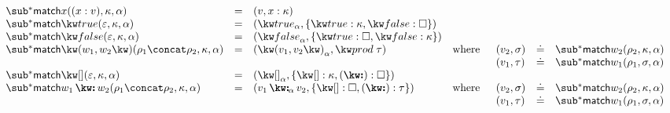 $\begin{array}{lllll}
   \matchBwdF{\matchVarNew{x}}(\bind{x}{v}, \kappa, \alpha)
   &=&
   (v, \elimVar{x}{\kappa})
   \\
   \matchBwdF{\matchTrueNew}(\seqEmpty, \kappa, \alpha)
   &=&
   (\annTrue{\alpha}, \elimBool{\kappa}{\hole})
   \\
   \matchBwdF{\matchFalseNew}(\seqEmpty, \kappa, \alpha)
   &=&
   (\annFalse{\alpha}, \elimBool{\hole}{\kappa})
   \\
   \matchBwdF{\matchPair{w_1}{w_2}}(\rho_1 \concat \rho_2, \kappa, \alpha)
   &=&
   (\annPair{v_1}{v_2}{\alpha}, \elimProd{\tau})
   &\text{where}&
   \begin{array}[t]{lll}
      (v_2, \sigma) &\eq& \matchBwdF{w_2}(\rho_2, \kappa, \alpha)
      \\
      (v_1, \tau) &\eq& \matchBwdF{w_1}(\rho_1, \sigma, \alpha)
   \end{array}
   \\
   \matchBwdF{\matchNilNew}(\seqEmpty,\kappa,\alpha)
   &=&
   (\annNil{\alpha}, \elimList{\kappa}{\hole})
   \\
   \matchBwdF{\matchConsNew{w_1}{w_2}}(\rho_1 \concat \rho_2, \kappa, \alpha)
   &=&
   (\annCons{v_1}{v_2}{\alpha}, \elimList{\hole}{\tau})
   &\text{where}&
   \begin{array}[t]{lll}
      (v_2, \sigma) &\eq& \matchBwdF{w_2}(\rho_2, \kappa, \alpha)
      \\
      (v_1, \tau) &\eq& \matchBwdF{w_1}(\rho_1, \sigma, \alpha)
   \end{array}
\end{array}$
